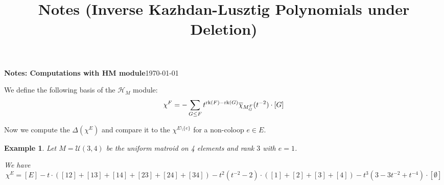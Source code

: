 \documentclass[11pt]{article}
\title{\texorpdfstring{Notes (Inverse Kazhdan-Lusztig Polynomials under Deletion)}{Notes (Inverse Kazhdan-Lusztig Polynomials under Deletion)}}
\newcommand{\rank}{\normalfont\text{rk}}
\newcommand{\chibar}{\overline{\chi}}
\newtheorem{example}[theorem]{Example}
\theoremstyle{remark}
\begin{document}
{\textbf{Notes: Computations with HM module}}\hfill {\small{\today}}

\hrulefill %

We define the following basis of the $\mathcal{H}_M$ module:
\[
\chi^F = - \sum_{G \le F} t^{\rank(F)-\rank(G)}\chibar_{M_G^F}(t^{-2})\cdot [G]
\]

Now we compute the $\Delta(\chi^E)$ and compare it to the $\chi^{E \setminus \{e\}}$ for a non-coloop $e \in E$.

\begin{example}
    Let $M = \mathcal{U}(3, 4)$ be the uniform matroid on 4 elements and rank $3$ with $e = 1$.

    We have
    \[
    \chi^E = [E] - t\cdot([12]+[13]+[14]+[23]+[24]+[34]) -
    t^2(t^{-2}-2)\cdot([1]+[2]+[3]+[4]) - t^3(3-3t^{-2}+t^{-4})\cdot[\emptyset]
    \]
\end{example}
\end{document}

